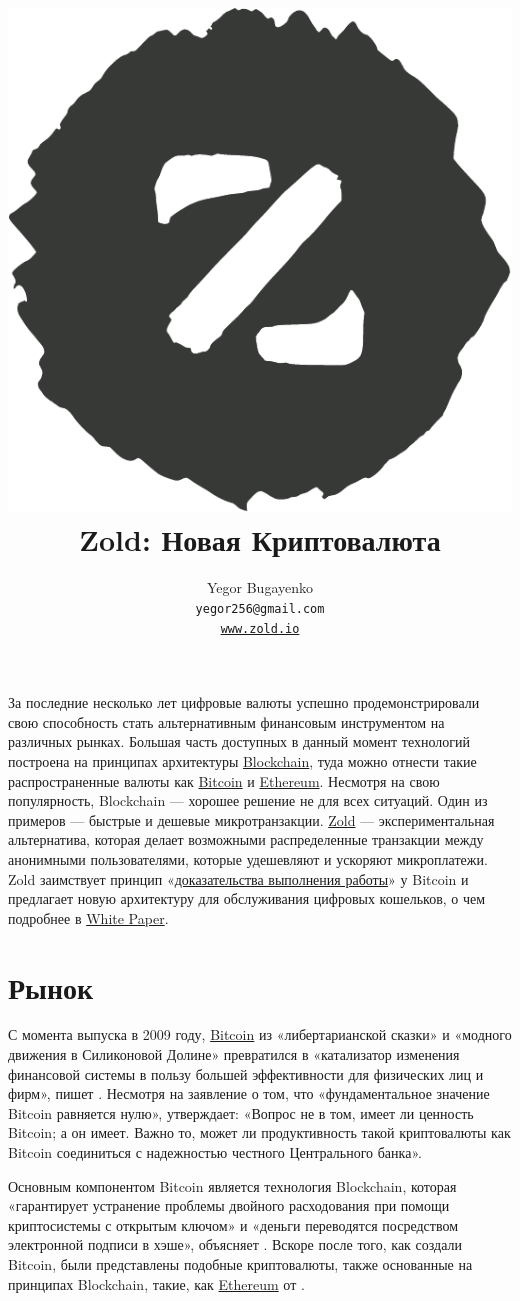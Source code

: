 \documentclass{main}
\title{\includegraphics[scale=0.3]{../images/logo.pdf}\\
  Zold: Новая Криптовалюта\\
  {\small\colorbox{zgreen}{\color{lgreen}{Green Paper}}}}
\author{Yegor Bugayenko\\
  \texttt{yegor256@gmail.com}\\
  \href{https://www.zold.io}{\texttt{www.zold.io}}\\[1em]
  \href{https://github.com/zold-io/papers/releases/tag/\zoldversion}{\texttt{\zoldversion}}}
\begin{document}
\maketitle

За последние несколько лет цифровые валюты успешно продемонстрировали свою
способность стать альтернативным финансовым инструментом на различных рынках.
Большая часть доступных в данный момент технологий построена на принципах
архитектуры \href{https://en.wikipedia.org/wiki/Blockchain}{Blockchain},
туда можно отнести такие распространенные валюты как
\href{https://bitcoin.org/}{Bit\-coin} и \href{https://ethereum.org/}{Ethe\-reum}.
Несмотря на свою популярность, Blockchain --- хорошее решение
не для всех ситуаций. Один из примеров --- быстрые и дешевые микротранзакции.
\href{https://www.zold.io}{Zold} --- экспериментальная альтернатива, которая делает возможными распределенные
транзакции между анонимными пользователями, которые удешевляют и ускоряют микроплатежи.
Zold заимствует принцип «\href{https://ru.wikipedia.org/wiki/%D0%94%D0%BE%D0%BA%D0%B0%D0%B7%D0%B0%D1%82%D0%B5%D0%BB%D1%8C%D1%81%D1%82%D0%B2%D0%BE_%D0%B2%D1%8B%D0%BF%D0%BE%D0%BB%D0%BD%D0%B5%D0%BD%D0%B8%D1%8F_%D1%80%D0%B0%D0%B1%D0%BE%D1%82%D1%8B}{доказательства выполнения работы}»
у Bitcoin и предлагает новую архитектуру для обслуживания
цифровых кошельков, о чем подробнее в \href{https://papers.zold.io}{White Paper}.

\pagebreak

\section*{Рынок}

С момента выпуска в 2009 году, \href{https://bitcoin.org/}{Bitcoin} из «либертарианской сказки»
и «модного движения в Силиконовой Долине» превратился в «катализатор изменения финансовой
системы в пользу большей эффективности для физических лиц и фирм», пишет
. Несмотря на заявление  о том, что «фундаментальное значение
Bitcoin равняется нулю»,  утверждает: «Вопрос не в том, имеет ли
ценность Bitcoin; а он имеет. Важно то, может ли продуктивность такой
криптовалюты как Bitcoin соединиться с надежностью честного Центрального банка».

Основным компонентом Bitcoin является технология Blockchain, которая
«гарантирует устранение проблемы двойного расходования при помощи криптосистемы
с открытым ключом» и «деньги переводятся посредством электронной подписи в
хэше», объясняет . Вскоре после того, как создали Bitcoin, были
представлены подобные криптовалюты, также основанные на принципах Blockchain,
такие, как \href{https://ethereum.org/}{Ethereum} от .
\end{document}
